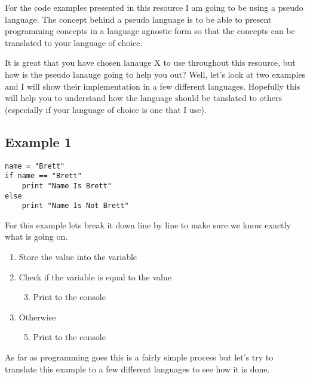 For the code examples presented in this resource I am going to be using a pseudo language.
The concept behind a pseudo language is to be able to present programming concepts in a
language agnostic form so that the concepts can be translated to your language of choice.
\par

It is great that you have chosen lanauge X to use throughout this resource, but how is the pseudo lanauge going to help you out?
Well, let's look at two examples and I will show their implementation in a few different languages.
Hopefully this will help you to understand how the language should be tanslated to others (especially if your language of choice is one that I use).

\subsection{Example 1}

\begin{lstlisting}[caption={Example 1 - Sudo Code}]
name = "Brett"
if name == "Brett"
    print "Name Is Brett"
else
    print "Name Is Not Brett"
\end{lstlisting}

For this example lets break it down line by line to make sure we know exactly what is going on.

\begin{enumerate}
    \item {Store the value  into the variable }
    \item {Check if the variable  is equal to the value }
    \begin{enumerate}
        \setcounter{enumii}{2}
        \item {Print  to the console}
    \end{enumerate}
    \setcounter{enumi}{3}
    \item {Otherwise}
    \begin{enumerate}
        \setcounter{enumii}{4}
        \item {Print  to the console}
    \end{enumerate}
\end{enumerate}

As far as programming goes this is a fairly simple process but let's try to translate this example to a few different languages to see how it is done.

